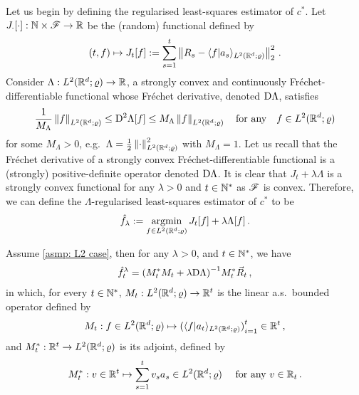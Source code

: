 Let us begin by defining the regularised least-squares estimator of $c^*$. 
Let $J_\cdot[\cdot]:\mathbb{N}\times\mathscr{F}\to\mathbb{R}$ be the (random) functional defined by 
\[
    (t,f)\mapsto J_t[f]:= \sum_{s=1}^t\left\lVert R_s - \langle f\vert a_s\rangle_{L^2(\mathbb{R}^d;\varrho)}\right\rVert^2_2 \,.
\]
Consider $\Lambda:L^2(\mathbb{R}^d;\varrho)\to\mathbb{R}$, a strongly convex and continuously Fréchet-differentiable functional whose Fréchet derivative, denoted $\mathrm{D} \Lambda$, satisfies
\begin{align}
    \frac1{M_\Lambda}\left\lVert f\right\rVert_{L^2(\mathbb{R}^d;\varrho)}\le \mathrm{D}^2\Lambda[f] \le M_\Lambda \left\lVert f\right\rVert_{L^2(\mathbb{R}^d;\varrho)} \quad\mbox{for any}\quad f\in L^2(\mathbb{R}^d;\varrho)\label{eq: Fréchet derivative of Lambda}
\end{align} 
for some $M_\Lambda>0$, e.g.\ $\Lambda=\frac12\left\lVert\cdot\right\rVert_{L^2(\mathbb{R}^d;\varrho)}^2$ with $M_\Lambda=1$. Let us recall that the Fréchet derivative of a strongly convex Fréchet-differentiable functional is a (strongly) positive-definite operator denoted $\mathrm{D} \Lambda$.
It is clear that $J_t+\lambda\Lambda$ is a strongly convex functional for any $\lambda>0$ and $t\in\mathbb{N}^*$ as $\mathscr{F}$ is convex. Therefore, we can define the $\Lambda$-regularised least-squares estimator of $c^*$ to be
\[
    \hat f_\lambda:=\operatorname*{argmin}_{f\in L^2(\mathbb{R}^d;\varrho)} J_t[f]+ \lambda\Lambda[f]\,.
\]
\begin{proposition}\label{prop: least squares estimator}
    Assume \cref{asmp: L2 case}, then for any $\lambda>0$, and $t\in\mathbb{N}^*$, we have 
    \begin{align}
        \hat f_t^\lambda = {(M_t^*M_t+\lambda\mathrm{D} \Lambda)}^{-1} M^*_t \vec{R}_t\,,\label{eq: reg least squares estimator}
    \end{align}
    in which, for every $t\in\mathbb{N}^*$, $M_t:L^2(\mathbb{R}^d;\varrho)\to \mathbb{R}^{t}$ is the linear a.s.\ bounded operator defined by 
    \begin{align}
        M_t: f\in L^2(\mathbb{R}^d;\varrho) \mapsto {(\langle f\vert a_t \rangle_{L^2(\mathbb{R}^d;\varrho)})}_{i=1}^t\in\mathbb{R}^t  \,,
    \end{align}
    and $M^*_t:\mathbb{R}^t\to L^2(\mathbb{R}^d;\varrho)$ is its adjoint, defined by
    \begin{align}
        M^*_t: v\in\mathbb{R}^t\mapsto \sum_{s=1}^t v_s a_s \in L^2(\mathbb{R}^d;\varrho) \quad \mbox{ for any } v\in\mathbb{R}_t\,.
    \end{align}
\end{proposition}


